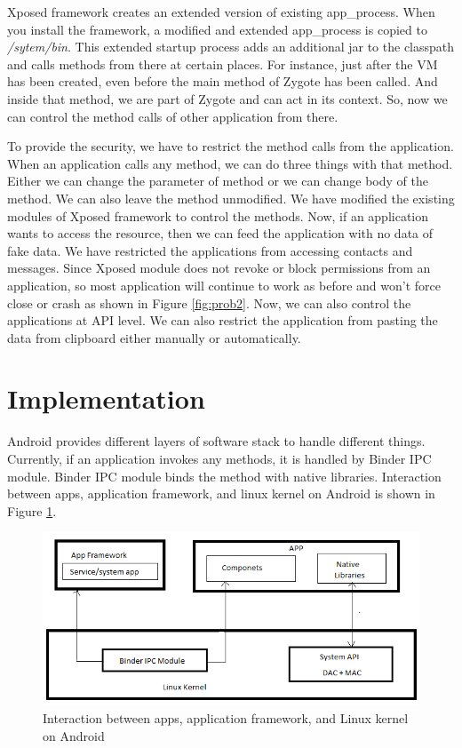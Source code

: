 Xposed framework creates an extended version of existing app\_process. When you install the framework, a modified and extended app\_process is copied to \textit{/sytem/bin}. This extended startup process adds an additional jar to the classpath and calls methods from there at certain places. For instance, just after the VM has been created, even before the main method of Zygote has been called. And inside that method, we are part of Zygote and can act in its context. So, now we can control
the method calls of other application from there.

To provide the security, we have to restrict the method calls from the application. When an application calls any method, we can do three things with that method. Either we can change the parameter of method or we can change body of the method. We can also leave the method unmodified. We have modified the existing modules of Xposed framework to control the methods. Now, if an application wants to access the resource, then we can feed the application with no data of fake data. We have restricted the applications from accessing contacts and messages. Since Xposed module does not revoke or block permissions from an application, so most application will continue to work as before and won't force close or crash as shown in Figure \ref{fig:prob2}. Now, we can also control the applications at API level. We can also restrict the application from pasting the data from clipboard either manually or automatically.
\section{Implementation}
Android provides different layers of software stack to handle different things. Currently, if an application invokes any methods, it is handled by Binder IPC module. Binder IPC module binds the method with native libraries. Interaction between apps, application framework, and linux kernel on Android is shown in Figure \ref{fig:impl1}.
\begin{figure}[!h]
  \centering
  \includegraphics [scale=0.8] {impl1.png}
  \caption{Interaction between apps, application framework, and Linux kernel on Android}
  \label{fig:impl1}
\end{figure}

